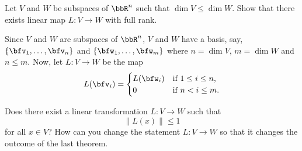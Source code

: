 \begin{questions}
  \question Let $V$ and $W$ be subspaces of $\bbR^n$ such that
  $\dim V\leq \dim W$. Show that there exists linear map $L\colon V\to W$
  with full rank.
  \begin{solution}
    Since $V$ and $W$ are subspaces of $\bbR^n$, $V$ and $W$ have a basis,
    say, $\{\bfv_1,\ldots,\bfv_n\}$ and $\{\bfw_1,\ldots,\bfw_m\}$ where
    $n=\dim V$, $m=\dim W$ and $n\leq m$. Now, let $L\colon V\to W$ be the
    map
    \[
      L(\bfv_i)=
      \begin{cases}
        L(\bfw_i)&\text{if $1\leq i\leq n$,}\\
        0&\text{if $n<i\leq m$.}
      \end{cases}
    \]
  \end{solution}
  \question Does there exist a linear transformation $L\colon V\to W$ such
  that
  \[
    \|L(x)\|\leq 1
  \]
  for all $x\in V$? How can you change the statement $L\colon V\to W$ so
  that it changes the outcome of the last theorem.
\end{questions}

